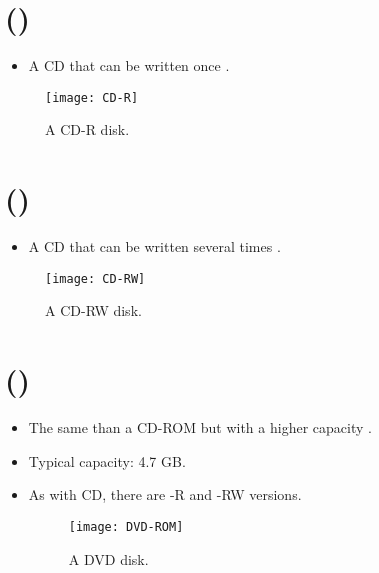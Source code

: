 \section{ ({)}}
\begin{itemize}
\item A \gls{CD} that can be written once \cite{wikipedia_CD-R}.
\end{itemize}
\begin{figure}[H]
  \vspace{-1ex}
  \centering
  \texttt{[image: CD-R]}
  \caption{A \gls{CD-R} disk.}
  \label{fig:CD-R}
\end{figure}

\section{ ({)}}
\begin{itemize}
\item A \gls{CD} that can be written several times \cite{wikipedia_CD-RW}.
\end{itemize}
\begin{figure}[H]
  \vspace{-1ex}
  \centering
  \texttt{[image: CD-RW]}
  \caption{A \gls{CD-RW} disk.}
  \label{fig:CD-RW}
\end{figure}

\section{ ({)}}
\begin{itemize}
\item The same than a \gls{CD-ROM} but with a higher capacity
  \cite{wikipedia_DVD}.
\item Typical capacity: 4.7 GB.
\item As with \gls{CD}, there are -R and -RW versions.
\begin{figure}[H]
  \vspace{-14ex}
  \begin{flushright}
    \texttt{[image: DVD-ROM]}
    \caption{A \gls{DVD} disk.}
    \label{fig:DVD}
  \end{flushright}
\end{figure}
\end{itemize}

